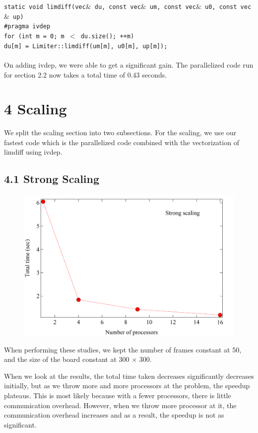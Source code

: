 \documentclass[11pt]{article}
\begin{document}
        \texttt{static void limdiff(vec$\&$ du, const vec$\&$ um, const vec$\&$ u0, const vec$\&$ up) { \\      
        \#pragma ivdep \\
        for (int m = 0; m $<$ du.size(); ++m) \\
            du[m] = Limiter::limdiff(um[m], u0[m], up[m]);\\
        } }\\
        On adding ivdep, we were able to get a significant gain. The parallelized code run for section 2.2 now takes a total time of 0.43 seconds. 
   
    \section{4 Scaling}
        We split the scaling section into two subsections. For the scaling, we use our fastest code which is the parallelized code combined with the vectorization of limdiff using ivdep.
             
    \subsection{4.1 Strong Scaling}
        \begin{figure}[H]
            \centering
            \includegraphics[width=5in]{strong.png}
        \end{figure}

        When performing these studies, we kept the number of frames constant at 50, and the size of the board constant at 300 $\times$ 300.

        When we look at the results, the total time taken decreases significantly decreases initially, but as we throw more and more processors at the problem, the speedup plateaus. This is most likely because with a fewer processors, there is little communication overhead. However, when we throw more processor at it, the communication overhead increases and as a result, the speedup is not as significant.
\end{document}
